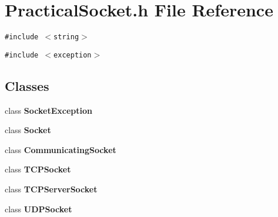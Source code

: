 \section{Practical\-Socket.h File Reference}
\label{PracticalSocket_8h}
{\tt \#include $<$string$>$}\par
{\tt \#include $<$exception$>$}\par
\subsection*{Classes}
\begin{CompactItemize}
\item 
class {\bf Socket\-Exception}
\item 
class {\bf Socket}
\item 
class {\bf Communicating\-Socket}
\item 
class {\bf TCPSocket}
\item 
class {\bf TCPServer\-Socket}
\item 
class {\bf UDPSocket}
\end{CompactItemize}
